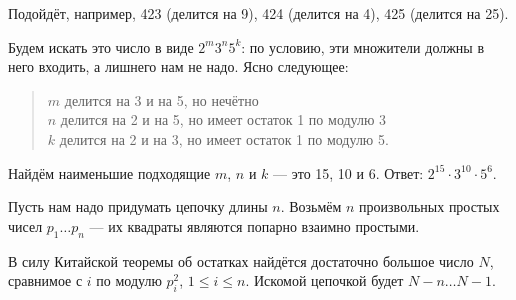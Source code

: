 \begin{itemize}

\itA Подойдёт, например, 423 (делится на 9), 424 (делится на 4), 425 (делится на 25).

\itB Будем искать это число в виде $2^m3^n5^k$: по условию, эти множители должны в него входить, а лишнего нам не надо. Ясно следующее:

\begin{quote}
$m$ делится на 3 и на 5, но нечётно\scolon \\
$n$ делится на 2 и на 5, но имеет остаток 1 по модулю 3\scolon\\
$k$ делится на 2 и на 3, но имеет остаток 1 по модулю 5.
\end{quote}

Найдём наименьшие подходящие $m$, $n$ и $k$ — это 15, 10 и 6. Ответ: $2^{15} \cdot 3^{10} \cdot 5^6$.

\itC Пусть нам надо придумать цепочку длины $n$. Возьмём $n$ произвольных простых чисел $p_1 \ldots p_n$ — их квадраты являются попарно взаимно простыми.

В силу Китайской теоремы об остатках найдётся достаточно большое число $N$, сравнимое с $i$ по модулю $p_i^2$, $1 \le i \le n$. Искомой цепочкой будет $N-n \ldots N-1$.
\end{itemize}
